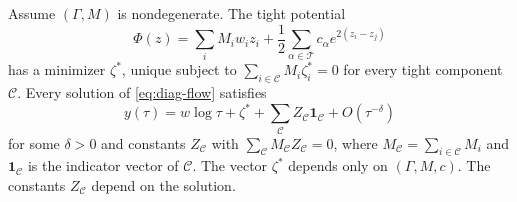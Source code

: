 \begin{theorem}\label{thm:diag-convergence}
Assume $(\Gamma,M)$ is nondegenerate. The tight potential
\[
 \Phi(z)=\sum_iM_iw_iz_i+\frac12\sum_{\alpha\in\mathcal T}c_\alpha e^{2(z_i-z_j)}
\]
has a minimizer $\zeta^*$, unique subject to $\sum_{i\in\mathcal C}M_i\zeta^*_i=0$
for every tight component $\mathcal C$. Every solution of \eqref{eq:diag-flow}
satisfies
\begin{equation}\label{eq:diag-asymptotics}
 y(\tau)=w\log\tau+\zeta^*+\sum_{\mathcal C}Z_{\mathcal C}\mathbf 1_{\mathcal C}+O(\tau^{-\delta})
\end{equation}
for some $\delta>0$ and constants $Z_{\mathcal C}$ with $\sum_{\mathcal C}M_{\mathcal C}Z_{\mathcal C}=0$, where
$M_{\mathcal C}=\sum_{i\in\mathcal C}M_i$ and $\mathbf 1_{\mathcal C}$ is the indicator vector of $\mathcal C$.
The vector $\zeta^*$ depends only on $(\Gamma,M,c)$. The constants $Z_{\mathcal C}$ depend
on the solution.
\end{theorem}

